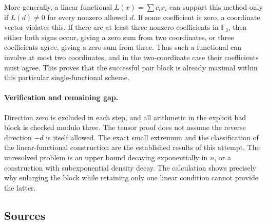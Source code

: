 \documentclass[11pt,a4paper]{article}
\newcommand{\F}{\mathbb{F}}
\begin{document}
More generally, a linear functional $L(x)=\sum c_ix_i$ can support this method only if $L(d)\ne0$ for every nonzero allowed $d$. If some coefficient is zero, a coordinate vector violates this. If there are at least three nonzero coefficients in $\F_3$, then either both signs occur, giving a zero sum from two coordinates, or three coefficients agree, giving a zero sum from three. Thus such a functional can involve at most two coordinates, and in the two-coordinate case their coefficients must agree. This proves that the successful pair block is already maximal within this particular single-functional scheme.

\paragraph{Verification and remaining gap.}
Direction zero is excluded in each step, and all arithmetic in the explicit bad block is checked modulo three. The tensor proof does not assume the reverse direction $-d$ is itself allowed. The exact small extremum and the classification of the linear-functional construction are the established results of this attempt. The unresolved problem is an upper bound decaying exponentially in $n$, or a construction with subexponential density decay. The calculation shows precisely why enlarging the block while retaining only one linear condition cannot provide the latter.

\subsection{Sources}
\end{document}
